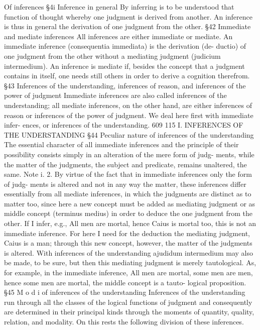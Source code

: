 Of inferences
§4i
Inference in general
By inferring is to be understood that function of thought whereby one
judgment is derived from another. An inference is thus in general the
derivation of one judgment from the other.
§42
Immediate and mediate inferences
All inferences are either immediate or mediate.
An immediate inference (consequentia immediata) is the derivation (de-
ductio) of one judgment from the other without a mediating judgment
(judicium intermedium). An inference is mediate if, besides the concept that
a judgment contains in itself, one needs still others in order to derive a
cognition therefrom.
§43
Inferences of the understanding, inferences of reason, and inferences of
the power of judgment
Immediate inferences are also called inferences of the understanding; all
mediate inferences, on the other hand, are either inferences of reason or
inferences of the power of judgment. We deal here first with immediate infer-
ences, or inferences of the understanding.
609
115
I. INFERENCES OF THE UNDERSTANDING
§44
Peculiar nature of inferences of the understanding
The essential character of all immediate inferences and the principle of
their possibility consists simply in an alteration of the mere form of judg-
ments, while the matter of the judgments, the subject and predicate,
remains unaltered, the same.
Note i.
2.
By virtue of the fact that in immediate inferences only the form of judg-
ments is altered and not in any way the matter, these inferences differ
essentially from all mediate inferences, in which the judgments are distinct
as to matter too, since here a new concept must be added as mediating
judgment or as middle concept (terminus medius) in order to deduce the
one judgment from the other. If I infer, e.g., All men are mortal, hence
Caius is mortal too, this is not an immediate inference. For here I need for
the deduction the mediating judgment, Caius is a man; through this new
concept, however, the matter of the judgments is altered.
With inferences of the understanding ajudidum intermedium may also be
made, to be sure, but then this mediating judgment is merely tautological.
As, for example, in the immediate inference, All men are mortal, some
men are men, hence some men are mortal, the middle concept is a tauto-
logical proposition.
§45
M o d i of inferences of the understanding
Inferences of the understanding run through all the classes of the logical
functions of judgment and consequently are determined in their principal
kinds through the moments of quantity, quality, relation, and modality. On
this rests the following division of these inferences.
